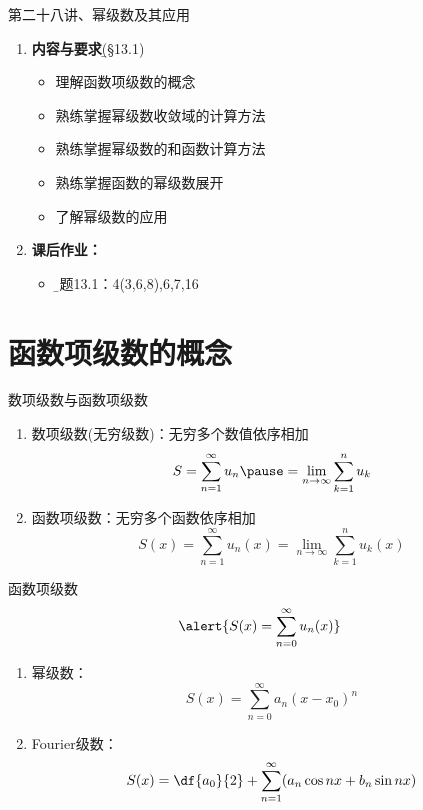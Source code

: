 
\begin{frame}{第二十八讲、幂级数及其应用}
	\linespread{1.5}
	\begin{enumerate}
	  \item {\bf 内容与要求}{\b (\S 13.1)}
	  \begin{itemize}
		\item 理解函数项级数的概念
		\item 熟练掌握幂级数收敛域的计算方法
		\item 熟练掌握幂级数的和函数计算方法
		\item 熟练掌握函数的幂级数展开
		\item 了解幂级数的应用
	  \vspace{1em}
	  \end{itemize}
	  \item {\bf  课后作业：}
	  \begin{itemize}
	    \item {\b 习题13.1：4(3,6,8),6,7,16}
	  \end{itemize}
	\end{enumerate}
\end{frame}

\section{函数项级数的概念}

\begin{frame}{数项级数与函数项级数}
	\linespread{1.5}
	\begin{enumerate}\pause 
	  \item {\bb 数项级数(无穷级数)：}\pause 无穷多个\alert{数值}依序相加\pause 
	  $$S=\sum\limits_{n=1}^{\infty}u_n
	  \pause =\lim\limits_{n\to\infty}\sum\limits_{k=1}^nu_k$$\pause 
	  \item {\bb 函数项级数：}\pause 无穷多个\alert{函数}依序相加\pause 
	  $$S(x)=\sum\limits_{n=1}^{\infty}u_n(x)
	  =\lim\limits_{n\to\infty}\sum\limits_{k=1}^nu_k(x)$$
	\end{enumerate}
\end{frame}

\begin{frame}{函数项级数}
	\linespread{1.2}
	$$\alert{S(x)=\sum\limits_{n=0}^{\infty}u_n(x)}$$
	\pause 
	\begin{enumerate}
	  \item {\bb 幂级数：}\pause 
	  $$S(x)=\sum\limits_{n=0}^{\infty}a_n(x-x_0)^n$$\pause 
	  \item {\bb Fourier级数：}\pause 
	  $$S(x)=\df{a_0}{2}+\sum\limits_{n=1}^{\infty}
	  (a_n\cos nx+b_n\sin nx)$$
	\end{enumerate}
\end{frame}

